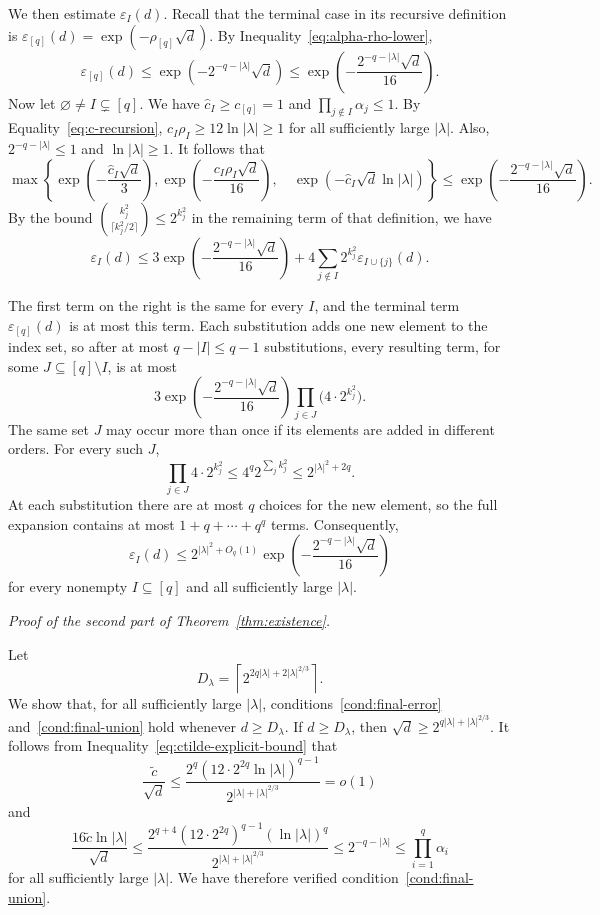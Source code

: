 \documentclass[10pt,a4paper]{amsart}
\numberwithin{equation}{section}
\begin{document}
We then estimate $\varepsilon_I(d)$. Recall that the terminal case in its
recursive definition is
$\varepsilon_{[q]}(d)=\exp(-\rho_{[q]}\sqrt d)$. By
Inequality~\eqref{eq:alpha-rho-lower},
\[
 \varepsilon_{[q]}(d)
 \leq\exp(-2^{-q-|\lambda|}\sqrt d)
 \leq\exp\left(-\frac{2^{-q-|\lambda|}\sqrt d}{16}\right).
\]
Now let $\varnothing\ne I\subsetneq[q]$. We have $\hat c_I\geq c_{[q]}=1$ and
$\prod_{j\notin I}\alpha_j\leq1$. By Equality~\eqref{eq:c-recursion},
$c_I\rho_I\geq12\ln|\lambda|\geq1$ for all sufficiently large
$|\lambda|$. Also,
$2^{-q-|\lambda|}\leq1$ and $\ln|\lambda|\geq1$. It follows that
\[
 \max\left\{
 \exp\left(-\frac{\hat c_I\sqrt d}{3}\right),
 \exp\left(-\frac{c_I\rho_I\sqrt d}{16}\right),\quad
 \exp(-\hat c_I\sqrt d\ln|\lambda|)
 \right\}
 \leq\exp\left(-\frac{2^{-q-|\lambda|}\sqrt d}{16}\right).
\]
By the bound
$\binom{k_j^2}{\lceil k_j^2/2\rceil}\leq2^{k_j^2}$ in the remaining term of
that definition, we have
\[
 \varepsilon_I(d)
 \leq3\exp\left(-\frac{2^{-q-|\lambda|}\sqrt d}{16}\right)
 +4\sum_{j\notin I}2^{k_j^2}\varepsilon_{I\cup\{j\}}(d).
\]

The first term on the right is the same for every $I$, and the terminal term
$\varepsilon_{[q]}(d)$ is at most this term. Each substitution adds one new
element to the index set, so after at most $q-|I|\leq q-1$ substitutions,
every resulting term, for some $J\subseteq[q]\setminus I$, is at most
\[
 3\exp\left(-\frac{2^{-q-|\lambda|}\sqrt d}{16}\right)
 \prod_{j\in J}\bigl(4\cdot2^{k_j^2}\bigr).
\]
The same set $J$ may occur more than
once if its elements are added in different orders. For every such $J$,
\[
 \prod_{j\in J}4\cdot2^{k_j^2}
 \leq4^q2^{\sum_jk_j^2}
 \leq2^{|\lambda|^2+2q}.
\]
At each substitution there are at most $q$ choices for the new element, so
the full expansion contains at most $1+q+\cdots+q^q$ terms. Consequently,
\begin{equation}\label{eq:error-asymptotic-bound}
 \varepsilon_I(d)
 \leq2^{|\lambda|^2+O_q(1)}
 \exp\left(-\frac{2^{-q-|\lambda|}\sqrt d}{16}\right)
\end{equation}
for every nonempty $I\subseteq[q]$ and all sufficiently large $|\lambda|$.

\medskip
\noindent

\emph{Proof of the second part of Theorem~\ref{thm:existence}.}

Let
\[
 D_\lambda=\left\lceil
 2^{2q|\lambda|+2|\lambda|^{2/3}}
 \right\rceil.
\]
We show that, for all sufficiently large $|\lambda|$,
conditions~\ref{cond:final-error} and~\ref{cond:final-union}
hold whenever $d\geq D_\lambda$.
If $d\geq D_\lambda$, then
$\sqrt d\geq2^{q|\lambda|+|\lambda|^{2/3}}$.
It follows from Inequality~\eqref{eq:ctilde-explicit-bound} that
\[
 \frac{\widetilde c}{\sqrt d}
 \leq
 \frac{2^q(12\cdot 2^{2q}\ln|\lambda|)^{q-1}}
 {2^{|\lambda|+|\lambda|^{2/3}}}
 =o(1)
\]
and
\[
 \frac{16\widetilde c\ln|\lambda|}{\sqrt d}
 \leq
 \frac{2^{q+4}(12\cdot 2^{2q})^{q-1}(\ln|\lambda|)^q}
 {2^{|\lambda|+|\lambda|^{2/3}}}
 \leq2^{-q-|\lambda|}
 \leq\prod_{i=1}^q\alpha_i
\]
for all sufficiently large $|\lambda|$. We have therefore verified
condition~\ref{cond:final-union}.
\end{document}
